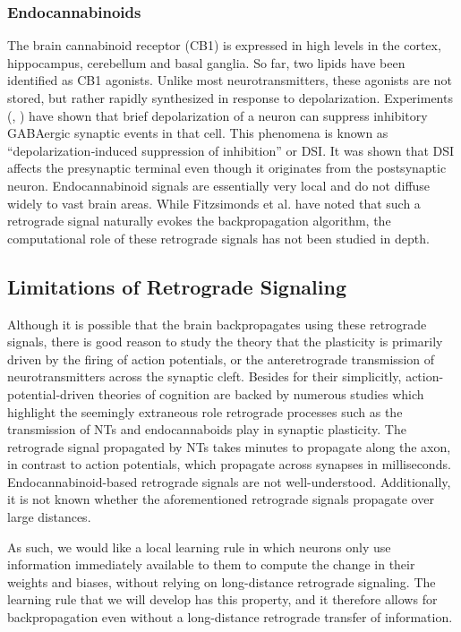 \documentclass[12pt]{article}
\begin{document}
\subsubsection{Endocannabinoids}
The brain cannabinoid receptor (CB1) is expressed in high levels in the cortex, hippocampus, cerebellum and basal ganglia. \cite{Wilson2002} So far, two lipids have been identified as CB1 agonists. Unlike most neurotransmitters, these agonists are not stored, but rather rapidly synthesized in response to depolarization. Experiments (\cite{Pitler1992}, \cite{Llano1991}) have shown that brief depolarization of a neuron can suppress inhibitory GABAergic synaptic events in that cell. This phenomena is known as ``depolarization‐induced suppression of inhibition'' or DSI. It was shown that DSI affects the presynaptic terminal even though it originates from the postsynaptic neuron. Endocannabinoid signals are essentially very local and do not diffuse widely to vast brain areas. \cite{Wilson2001} While Fitzsimonds et al. \cite{Fitzsimons1997} have noted that such a retrograde signal naturally evokes the backpropagation algorithm, the computational role of these retrograde signals has not been studied in depth.

\subsection{Limitations of Retrograde Signaling}
Although it is possible that the brain backpropagates using these retrograde signals, there is good reason to study the theory that the plasticity is primarily driven by the firing of action potentials, or the anteretrograde transmission of neurotransmitters across the synaptic cleft. Besides for their simplicitly, action-potential-driven theories of cognition are backed by numerous studies which highlight the seemingly extraneous role retrograde processes such as the transmission of NTs and endocannaboids play in synaptic plasticity. The retrograde signal propagated by NTs takes minutes to propagate along the axon, \cite{Poo2001} in contrast to action potentials, which propagate across synapses in milliseconds. Endocannabinoid-based retrograde signals are not well-understood. \cite{OhnoShosaku2014} Additionally, it is not known whether the aforementioned retrograde signals propagate over large distances. \cite{Matusica2014}

As such, we would like a local learning rule in which neurons only use information immediately available to them to compute the change in their weights and biases, without relying on long-distance retrograde signaling. The learning rule that we will develop has this property, and it therefore allows for backpropagation even without a long-distance retrograde transfer of information.
\end{document}
